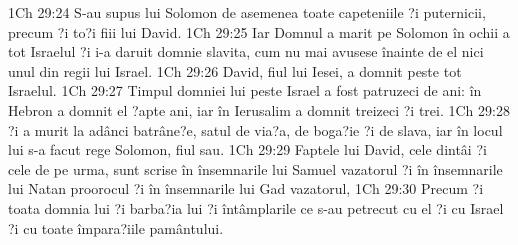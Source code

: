 1Ch 29:24  S-au supus lui Solomon de asemenea toate capeteniile ?i puternicii, precum ?i to?i fiii lui David.
1Ch 29:25  Iar Domnul a marit pe Solomon în ochii a tot Israelul ?i i-a daruit domnie slavita, cum nu mai avusese înainte de el nici unul din regii lui Israel.
1Ch 29:26  David, fiul lui Iesei, a domnit peste tot Israelul.
1Ch 29:27  Timpul domniei lui peste Israel a fost patruzeci de ani: în Hebron a domnit el ?apte ani, iar în Ierusalim a domnit treizeci ?i trei.
1Ch 29:28  ?i a murit la adânci batrâne?e, satul de via?a, de boga?ie ?i de slava, iar în locul lui s-a facut rege Solomon, fiul sau.
1Ch 29:29  Faptele lui David, cele dintâi ?i cele de pe urma, sunt scrise în însemnarile lui Samuel vazatorul ?i în însemnarile lui Natan proorocul ?i în însemnarile lui Gad vazatorul,
1Ch 29:30  Precum ?i toata domnia lui ?i barba?ia lui ?i întâmplarile ce s-au petrecut cu el ?i cu Israel ?i cu toate împara?iile pamântului.


